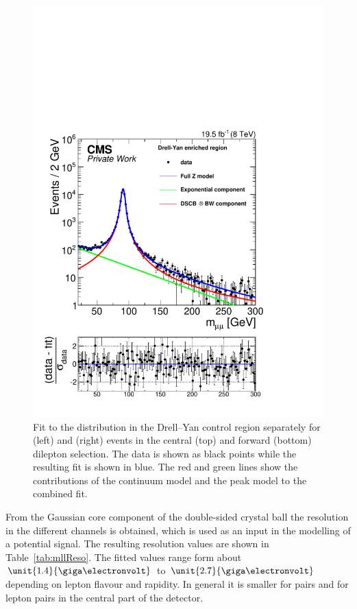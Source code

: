\begin{figure}[htbp]
\begin{minipage}[t]{0.49\textwidth}
\includegraphics[width=\textwidth]{plots/results/fit/expoFitMM_Log_Forward.pdf}
\end{minipage}
\caption{Fit to the \mll distribution in the Drell--Yan control region separately for \EE (left) and \MM (right) events in the central (top) and forward (bottom) dilepton selection. The data is shown as black points while the resulting fit is shown in blue. The red and green lines show the contributions of the continuum model and the peak model to the combined fit.}
\label{fig:dyFits}
\end{figure}
From the Gaussian core component of the double-sided crystal ball the \mll resolution in the different channels is obtained, which is used as an input in the modelling of a potential signal. The resulting resolution values are shown in Table~\ref{tab:mllReso}. The fitted values range form about $\unit{1.4}{\giga\electronvolt}$ to $\unit{2.7}{\giga\electronvolt}$ depending on lepton flavour and rapidity. In general it is smaller for \MM pairs and for lepton pairs in the central part of the detector.  

